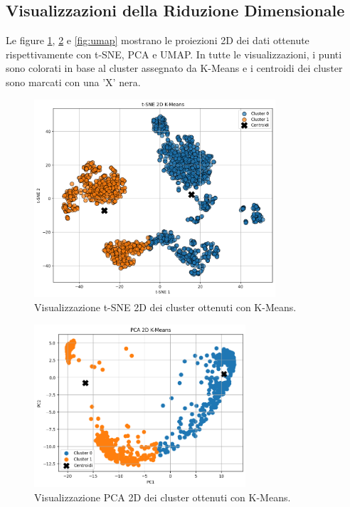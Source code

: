 \documentclass[11pt, a4paper]{article}
\begin{document}
\subsection{Visualizzazioni della Riduzione Dimensionale}
Le figure \ref{fig:tsne}, \ref{fig:pca} e \ref{fig:umap} mostrano le proiezioni 2D dei dati ottenute rispettivamente con t-SNE, PCA e UMAP. In tutte le visualizzazioni, i punti sono colorati in base al cluster assegnato da K-Means e i centroidi dei cluster sono marcati con una 'X' nera.

\begin{figure}[H]
    \centering
    \includegraphics[width=0.8\textwidth]{images/clustering_tsne.png}
    \caption{Visualizzazione t-SNE 2D dei cluster ottenuti con K-Means.}
    \label{fig:tsne}
\end{figure}

\begin{figure}[H]
    \centering
    \includegraphics[width=0.7\textwidth]{images/clustering_pca.png}
    \caption{Visualizzazione PCA 2D dei cluster ottenuti con K-Means.}
    \label{fig:pca}
\end{figure}
\end{document}
